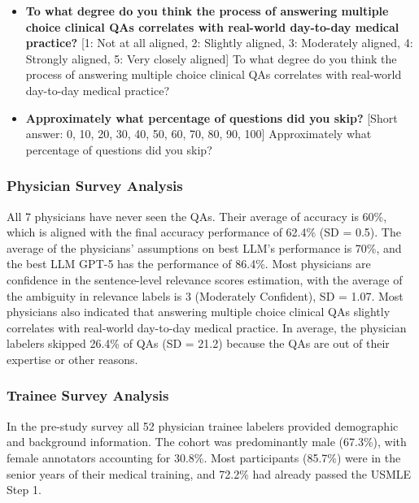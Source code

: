 \documentclass[11pt]{article}
\begin{document}
\begin{tcolorbox}[palebluebox]
\begin{itemize}
    \vspace{2mm}
    
    \item \textbf{To what degree do you think the process of answering multiple choice clinical QAs correlates with real-world day-to-day medical practice?} [1: Not at all aligned, 2: Slightly aligned, 3: Moderately aligned, 4: Strongly aligned, 5: Very closely aligned] To what degree do you think the process of answering multiple choice clinical QAs correlates with real-world day-to-day medical practice?
    
    \vspace{2mm}
    
    \item \textbf{Approximately what percentage of questions did you skip?} [Short answer: 0, 10, 20, 30, 40, 50, 60, 70, 80, 90, 100] Approximately what percentage of questions did you skip?
\end{itemize}

\end{tcolorbox}


\subsubsection{Physician Survey Analysis}

All 7 physicians have never seen the QAs. Their average of accuracy is 60\%, which is aligned with the final accuracy performance of 62.4\% (SD = 0.5). The average of the physicians' assumptions on best LLM's performance is 70\%, and the best LLM GPT-5 has the performance of 86.4\%. Most physicians are confidence in the sentence-level relevance scores estimation, with the average of the ambiguity in relevance labels is 3 (Moderately Confident), SD = 1.07. Most physicians also indicated that answering multiple choice clinical QAs slightly correlates with real-world day-to-day medical practice. In average, the physician labelers skipped 26.4\% of QAs (SD = 21.2) because the QAs are out of their expertise or other reasons.

\subsubsection{Trainee Survey Analysis}
In the pre‑study survey all 52 physician trainee labelers provided demographic and background information. The cohort was predominantly male (67.3\%), with female annotators accounting for 30.8\%. Most participants (85.7\%) were in the senior years of their medical training, and 72.2\% had already passed the USMLE Step 1. 
\end{document}
